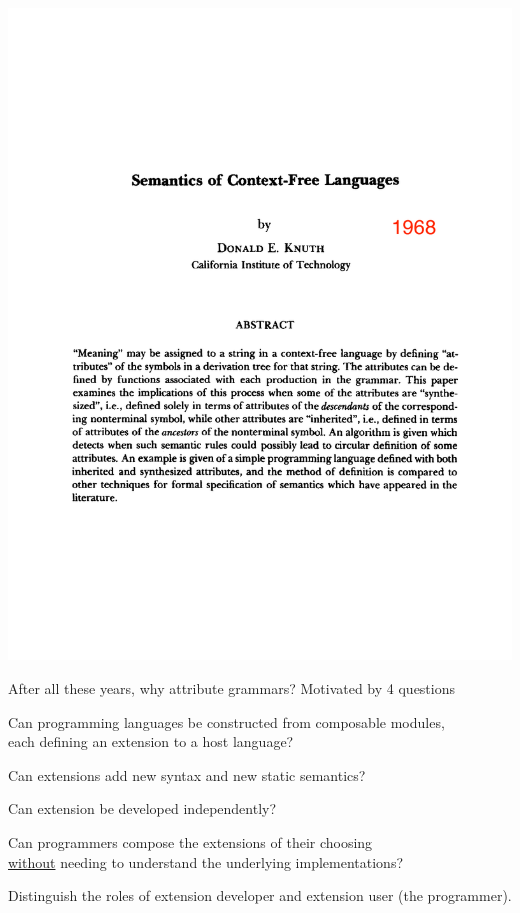\documentclass[notes,11pt,aspectratio=169]{beamer}
\begin{document}
\begin{frame}%
\includegraphics[width=0.95\linewidth,trim={0 0 0 7cm},clip]{Knuth-Page-1-with-date.pdf}
\end{frame}


\begin{frame}{After all these years, why attribute grammars?}
\pause
Motivated by 4 questions

\bigskip\pause
\beA
\x Can programming languages be constructed from composable modules, \\
   each defining an extension to a host language?

\pause
\x Can extensions add new syntax and new static semantics?

\pause
\x Can extension be developed independently?

\pause
\x Can programmers compose the extensions of their choosing \\
   \underline{without} needing to understand the underlying
   implementations?

   \bigskip
   Distinguish the roles of extension developer and extension user
   (the programmer).
\ee

\end{frame}
\end{document}

